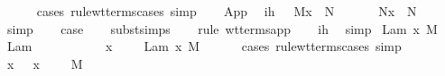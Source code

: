 \begin{isabellebody}
\ \ \ \ \isamarkupfalse%
\ {\isacharparenleft}cases\ rule{\isacharcolon}wt{\isacharunderscore}terms{\isachardot}cases{\isacharcomma}\ simp{\isacharparenright}\isanewline
\ \ \isamarkupfalse%
\ App{\isacharparenleft}{}{\isacharcomma}{}{\isacharcomma}{}{\isacharparenright}\ \isamarkupfalse%
\ ih{\isacharcolon}\ {\isachardoublequoteopen}{\isasymGamma}\ {\isasymturnstile}\ M{\isacharprime}{\isacharbrackleft}x\ {\isacharcolon}{\isacharcolon}{\isacharequal}\ N{\isacharbrackright}\ {\isacharcolon}\ {\isasympi}\ {\isasymrightarrow}\ {\isasymsigma}{\isachardoublequoteclose}\ {\isachardoublequoteopen}{\isasymGamma}\ {\isasymturnstile}\ N{\isacharprime}{\isacharbrackleft}x\ {\isacharcolon}{\isacharcolon}{\isacharequal}\ N{\isacharbrackright}\ {\isacharcolon}\ {\isasympi}{\isachardoublequoteclose}\ \isamarkupfalse%
\ simp{\isacharplus}\isanewline
\ \ \isamarkupfalse%
\ {\isacharquery}case\isanewline
\ \ \isamarkupfalse%
\ subst{\isachardot}simps\isanewline
\ \ \isamarkupfalse%
\ {\isacharparenleft}rule\ wt{\isacharunderscore}terms{\isachardot}app{\isacharparenright}\isanewline
\ \ \isamarkupfalse%
\ ih\ \isamarkupfalse%
\ simp{\isacharplus}\isanewline
{}\isamarkupfalse%
\isanewline
{}\isamarkupfalse%
\ {\isacharparenleft}Lam\ x{\isacharprime}\ M{\isacharparenright}\isanewline
\ \ \isamarkupfalse%
\ Lam{\isacharparenleft}{}{\isacharparenright}\ \isamarkupfalse%
\ {\isasympi}\ {\isasymdelta}\ \ {}{\isacharcolon}\ {\isachardoublequoteopen}{\isasymsigma}\ {\isacharequal}\ {\isasympi}\ {\isasymrightarrow}\ {\isasymdelta}{\isachardoublequoteclose}\ {\isachardoublequoteopen}{\isacharparenleft}x{\isacharcomma}\ {\isasymtau}{\isacharparenright}\ {\isacharhash}\ {\isasymGamma}\ {\isasymturnstile}\ Lam\ {\isacharbrackleft}x{\isacharprime}{\isacharbrackright}{\isachardot}\ M\ {\isacharcolon}\ {\isasympi}\ {\isasymrightarrow}\ {\isasymdelta}{\isachardoublequoteclose}\ \isamarkupfalse%
\ {\isacharparenleft}cases\ rule{\isacharcolon}wt{\isacharunderscore}terms{\isachardot}cases{\isacharcomma}\ simp{\isacharparenright}\isanewline
\ \ \isamarkupfalse%
\ {}{\isacharparenleft}{}{\isacharparenright}\ \isamarkupfalse%
\ {\isachardoublequoteopen}{\isacharparenleft}x{\isacharprime}{\isacharcomma}\ {\isasympi}{\isacharparenright}\ {\isacharhash}\ {\isacharparenleft}x{\isacharcomma}\ {\isasymtau}{\isacharparenright}\ {\isacharhash}\ {\isasymGamma}\ {\isasymturnstile}\ M\ {\isacharcolon}\ {\isasymdelta}{\isachardoublequoteclose}\ \isamarkupfalse%

\end{isabellebody}
